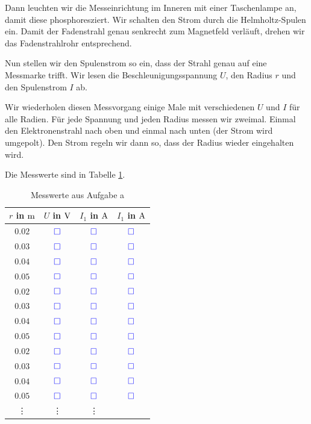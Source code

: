 \documentclass[11pt]{article}
\newcommand{\messwert}{\textcolor{blue}{\square}}
\begin{document}
Dann leuchten wir die Messeinrichtung im Inneren mit einer Taschenlampe an,
damit diese phosphoresziert. Wir schalten den Strom durch die Helmholtz-Spulen
ein. Damit der Fadenstrahl genau senkrecht zum Magnetfeld verläuft, drehen wir
das Fadenstrahlrohr entsprechend.

Nun stellen wir den Spulenstrom so ein, dass der Strahl genau auf eine
Messmarke trifft. Wir lesen die Beschleunigungsspannung $U$, den Radius $r$ und
den Spulenstrom $I$ ab.

Wir wiederholen diesen Messvorgang einige Male mit verschiedenen $U$ und $I$
für alle Radien. Für jede Spannung und jeden Radius messen wir zweimal. Einmal
den Elektronenstrahl nach oben und einmal nach unten (der Strom wird umgepolt).
Den Strom regeln wir dann so, dass der Radius wieder eingehalten wird.

Die Messwerte sind in Tabelle \ref{table:Aufgabe-a}.

\begin{table}[H]
	\centering

	\begin{tabular}{cccc}
		$r$ in $\unit m$ & $U$ in $\unit V$ & $I_1$ in $\unit A$ & $I_1$ in $\unit A$ \\
		\hline
		$0.02$ & $\messwert$ & $\messwert$ & $\messwert$ \\
		$0.03$ & $\messwert$ & $\messwert$ & $\messwert$ \\
		$0.04$ & $\messwert$ & $\messwert$ & $\messwert$ \\
		$0.05$ & $\messwert$ & $\messwert$ & $\messwert$ \\
		\hline
		$0.02$ & $\messwert$ & $\messwert$ & $\messwert$ \\
		$0.03$ & $\messwert$ & $\messwert$ & $\messwert$ \\
		$0.04$ & $\messwert$ & $\messwert$ & $\messwert$ \\
		$0.05$ & $\messwert$ & $\messwert$ & $\messwert$ \\
		\hline
		$0.02$ & $\messwert$ & $\messwert$ & $\messwert$ \\
		$0.03$ & $\messwert$ & $\messwert$ & $\messwert$ \\
		$0.04$ & $\messwert$ & $\messwert$ & $\messwert$ \\
		$0.05$ & $\messwert$ & $\messwert$ & $\messwert$ \\
		\hline
		   \vdots & \vdots & \vdots
	\end{tabular}

	\caption{Messwerte aus Aufgabe a}
	\label{table:Aufgabe-a}
\end{table}
\end{document}
